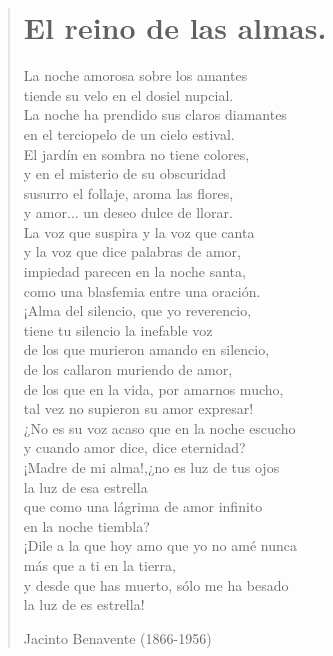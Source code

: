 \documentclass[12pt, twoside]{book}
\begin{document}
\begin{verse}
\begin{center}
\section{El reino de las almas.}
\end{center}

La noche amorosa sobre los amantes\\
tiende su velo en el dosiel nupcial.\\
La noche ha prendido sus claros diamantes\\
en el terciopelo de un cielo estival.\\
El jardín en sombra no tiene colores,\\
y en el misterio de su obscuridad\\
susurro el follaje, aroma las flores,\\
y amor... un deseo dulce de llorar.\\
La voz que suspira y la voz que canta\\
y la voz que dice palabras de amor,\\
impiedad parecen en la noche santa,\\
como una blasfemia entre una oración.\\
¡Alma del silencio, que yo reverencio,\\
tiene tu silencio la inefable voz\\
de los que murieron amando en silencio,\\
de los callaron muriendo de amor,\\
de los que en la vida, por amarnos mucho,\\
tal vez no supieron su amor expresar!\\
¿No es su voz acaso que en la noche escucho\\
y cuando amor dice, dice eternidad?\\
¡Madre de mi alma!,¿no es luz de tus ojos\\
la luz de esa estrella\\
que como una lágrima de amor infinito\\
en la noche tiembla?\\
¡Dile a la que hoy amo que yo no amé nunca\\
más que a ti en la tierra,\\
y desde que has muerto, sólo me ha besado\\
la luz de es estrella!\newline

Jacinto Benavente (1866-1956)
\end{verse}
\newpage
\end{document}

